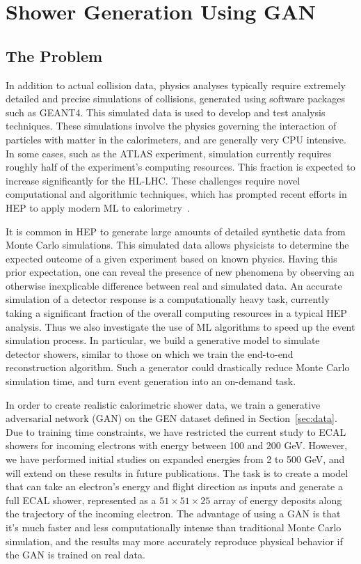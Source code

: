 \chapter{Shower Generation Using GAN}\label{sec:GAN}

\section{The Problem}

In addition to actual collision data, physics analyses typically require extremely detailed and precise simulations of collisions, generated using software packages such as GEANT4\cite{GEANT4}. This simulated data is used to develop and test analysis techniques. These simulations involve the physics governing the interaction of particles with matter in the calorimeters, and are generally very CPU intensive. In some cases, such as the ATLAS experiment, simulation currently requires roughly half of the experiment's computing resources\cite{GEANT_usage}. This fraction is expected to increase significantly for the HL-LHC. These challenges require novel computational and algorithmic techniques, which has prompted recent efforts in HEP to apply modern ML to calorimetry~\cite{ML1,ML2,ML3,ML4}.

It is common in HEP to generate large amounts of detailed synthetic data from Monte Carlo simulations. This simulated data allows physicists to determine the expected outcome of a given experiment based on known physics. Having this prior expectation, one can reveal the presence of new phenomena by observing an otherwise inexplicable difference between real and simulated data. An accurate simulation of a detector response is a computationally heavy task, currently taking a significant fraction of the overall computing resources in a typical HEP analysis. Thus we also investigate the use of ML algorithms to speed up the event simulation process. In particular, we build a generative model to simulate detector showers, similar to those on which we train the end-to-end reconstruction algorithm. Such a generator could drastically reduce Monte Carlo simulation time, and turn event generation into an on-demand task.

In order to create realistic calorimetric shower data, we train a generative adversarial network (GAN) on the GEN dataset defined in Section~\ref{sec:data}. Due to training time constraints, we have restricted the current study to ECAL showers for incoming electrons with energy between 100 and 200 GeV. However, we have performed initial studies on expanded energies from 2 to 500 GeV, and will extend on these results in future publications. The task is to create a model that can take an electron's energy and flight direction as inputs and generate a full ECAL shower, represented as a $51 \times 51 \times 25$ array of energy deposits along the trajectory of the incoming electron. 
The advantage of using a GAN is that it's much faster and less computationally intense than traditional Monte Carlo simulation, and the results may more accurately reproduce physical behavior if the GAN is trained on real data.

